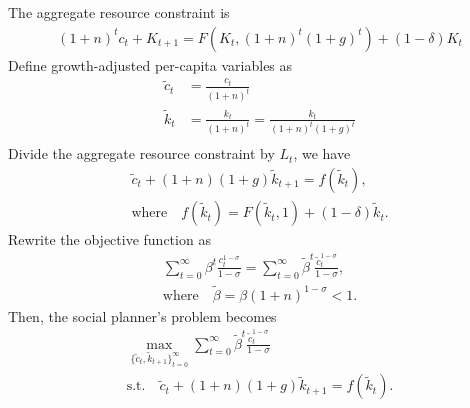 \documentclass{ltjsarticle}
\begin{document}
\section{} %
The aggregate resource constraint is
\begin{gather*}
    (1+n)^t c_t + K_{t+1} = F(K_t, (1+n)^t (1+g)^t) + (1-\delta)K_t
\end{gather*}
Define growth-adjusted per-capita variables as
\begin{align*}
    \tilde{c}_t &= \frac{c_t}{(1+n)^t} \\
    \tilde{k}_t &= \frac{k_t}{(1+n)^t} = \frac{k_t}{(1+n)^t(1+g)^t} \\
\end{align*}
Divide the aggregate resource constraint by $L_t$, we have
\begin{gather*}
    \tilde{c}_t + (1+n)(1+g) \tilde{k}_{t+1} = f(\tilde{k}_t),\\
    \text{where} \quad f(\tilde{k}_t) = F(\tilde{k}_t, 1) + (1-\delta)\tilde{k}_t.
\end{gather*}
Rewrite the objective function as
\begin{gather*}
    \sum_{t=0}^\infty \beta^t \frac{c_{t}^{1-\sigma}}{1-\sigma} 
    = \sum_{t=0}^\infty \tilde{\beta}^t \frac{\tilde{c}_{t}^{1-\sigma}}{1-\sigma},\\
    \text{where} \quad \tilde{\beta} = \beta (1+n)^{1-\sigma} < 1.
\end{gather*}
Then, the social planner's problem becomes
\begin{gather*}
    \max_{\{\tilde{c}_t, \tilde{k}_{t+1}\}^{\infty}_{t=0}} \sum_{t=0}^\infty \tilde{\beta}^t \frac{\tilde{c}_{t}^{1-\sigma}}{1-\sigma} \\
    \text{s.t.} \quad \tilde{c}_t + (1+n)(1+g) \tilde{k}_{t+1} = f(\tilde{k}_t).
\end{gather*}
\end{document}
